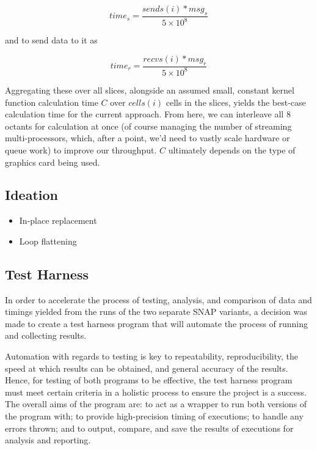 \documentclass[conference]{IEEEtran}
\begin{document}
\begin{equation}
time_s = \frac{sends(i) * msg_s}{5 \times 10^8}
\end{equation}

and to send data to it as

\begin{equation}
time_r = \frac{recvs(i) * msg_r}{5 \times 10^8}
\end{equation}

Aggregating these over all slices, alongside an assumed small, constant kernel function calculation time $ C $ over $ cells(i) $ cells in the slices, yields the best-case calculation time for the current approach. From here, we can interleave all 8 octants for calculation at once (of course managing the number of streaming multi-processors, which, after a point, we'd need to vastly scale hardware or queue work) to improve our throughput. $C$ ultimately depends on the type of graphics card being used.

\subsection{Ideation}
\label{sec:ideation}

\begin{itemize}
    \item In-place replacement
    \item Loop flattening
\end{itemize}

\subsection{Test Harness}

In order to accelerate the process of testing, analysis, and comparison of data and timings yielded from the runs of the two separate SNAP variants, a decision was made to create a test harness program that will automate the process of running and collecting results.

Automation with regards to testing is key to repeatability, reproducibility, the speed at which results can be obtained, and general accuracy of the results. Hence, for testing of both programs to be effective, the test harness program must meet certain criteria in a holistic process to ensure the project is a success. The overall aims of the program are: to act as a wrapper to run both versions of the program with; to provide high-precision timing of executions; to handle any errors thrown; and to output, compare, and save the results of executions for analysis and reporting.
\end{document}
